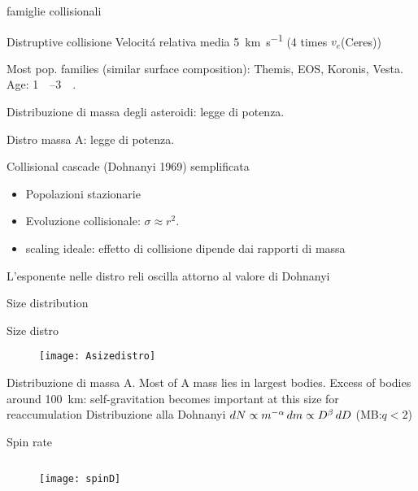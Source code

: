 \begin{wordonframe}{famiglie collisionali}\tolbf
\begin{block}{Distruptive collisione}
Velocit\'a relativa media \SI{5}{\kilo\meter\per\second} (4 times $v_e$(Ceres))
\end{block}
Most pop. families (similar surface composition): Themis, EOS, Koronis, Vesta. Age: \SIrange{1}{3}{\giga\year}.
\end{wordonframe}

\begin{frame}{Distribuzione di massa degli asteroidi: legge di potenza.}
\begin{block}{}\end{block}
\end{frame}

\begin{wordonframe}{Distro massa A: legge di potenza.}
\begin{block}{Collisional cascade (Dohnanyi 1969) semplificata}
\begin{itemize}
\item Popolazioni stazionarie
\item Evoluzione collisionale: $\sigma\approx r^2$.
\item scaling ideale: effetto di collisione dipende dai rapporti di massa
\end{itemize}
L'esponente nelle distro reli oscilla attorno al valore di Dohnanyi
\end{block}

\end{wordonframe}

\begin{frame}{Size distribution}
\begin{block}{Size distro}
\begin{figure}[!ht]\texttt{[image: Asizedistro]}
\end{figure}
\end{block}
\end{frame}

\begin{wordonframe}{Distribuzione di massa A.}
Most of A mass lies in largest bodies. Excess of bodies around \SI{100}{\kilo\meter}: self-gravitation becomes important at this size for reaccumulation
Distribuzione alla Dohnanyi  $dN\propto m^{-\alpha}\,dm\propto D^{\beta}\,dD$ (MB:$q<2$)
\end{wordonframe}

\begin{frame}{Spin rate}
\begin{columns}[T]
\begin{column}{0.5\textwidth}
\begin{figure}[!ht]\texttt{[image: spinD]}
\end{figure}
\end{column}
\begin{column}{0.5\textwidth}
\end{column}
\end{columns}
\end{frame}

